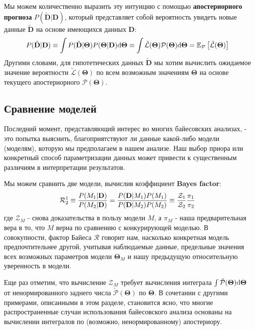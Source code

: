 \documentclass[12pt, titlepage]{article}
\newcommand{\deriv}{\ensuremath{{\rm d}}}  %
\newcommand{\meanwrt}[2]{\ensuremath{\mathbb{E}_{{#2}}\left[{#1}\right]}}
\newcommand{\params}{\ensuremath{\boldsymbol\Theta}}
\newcommand{\data}{\ensuremath{\mathbf{D}}}
\newcommand{\likelihood}{\ensuremath{\mathcal{L}}}
\newcommand{\prior}{\ensuremath{\pi}}
\newcommand{\posterior}{\ensuremath{\mathcal{P}}}
\newcommand{\evidence}{\ensuremath{\mathcal{Z}}}
\newcommand{\bayesfactor}{\ensuremath{\mathcal{R}}}
\begin{document}
Мы можем количественно выразить эту интуицию с помощью \textbf{апостериорного прогноза} $P(\tilde{\data}|\data)$, который представляет собой вероятность увидеть новые данные $\tilde{\data}$ на основе имеющихся данных $\data$:
\begin{equation}
    P(\tilde{\data}|\data) 
    \equiv \int P(\tilde{\data}|\params) P(\params|\data) \deriv \params
    \equiv \int \tilde{\likelihood}(\params) \posterior(\params) \deriv \params
    = \meanwrt{\tilde{\likelihood}(\params)}{\posterior}
\end{equation}
Другими словами, для гипотетических данных $\tilde{\data}$ мы хотим вычислить ожидаемое значение вероятности $\tilde{\likelihood}(\params)$ по всем возможным значениям $\params$ на основе текущего апостериорного $\posterior(\params)$.

\subsection{Сравнение моделей} \label{subsec:evid}

Последний момент, представляющий интерес во многих байесовских анализах, - это попытка выяснить, благоприятствуют ли данные какой-либо модели (моделям), которую мы предполагаем в нашем анализе. Наш выбор приора или конкретный способ параметризации данных может привести к существенным различиям в интерпретации результатов.

Мы можем сравнить две модели, вычислив коэффициент \textbf{Bayes factor}:
\begin{equation}
    \bayesfactor^{1}_{2}
    \equiv \frac{P(M_{\rm 1}|\data)}{P(M_{\rm 2}|\data)}
    = \frac{P(\data|M_{\rm 1})P(M_{\rm 1})}{P(\data|M_{\rm 2})P(M_{\rm 2})}
    \equiv \frac{\evidence_{\rm 1}}{\evidence_{\rm 2}} 
    \frac{\prior_{\rm 1}}{\prior_{\rm 2}}
\end{equation}
где $\evidence_M$ - снова доказательства в пользу модели $M$, а $\prior_M$ - наша предварительная вера в то, что $M$ верна по сравнению с конкурирующей моделью. В совокупности, фактор Байеса $\bayesfactor$ говорит нам, насколько конкретная модель предпочтительнее другой, учитывая наблюдаемые данные, предельные значения всех возможных параметров модели $\params_M$ и нашу предыдущую относительную уверенность в модели.

Еще раз отметим, что вычисление $\evidence_M$ требует вычисления интеграла $\int \tilde{\posterior}(\params) \deriv \params$ от ненормированного заднего числа $\tilde{\posterior}(\params)$ по $\params$. В сочетании с другими примерами, описанными в этом разделе, становится ясно, что многие распространенные случаи использования байесовского анализа основаны на вычислении интегралов по (возможно, ненормированному) апостериору.
\end{document}
